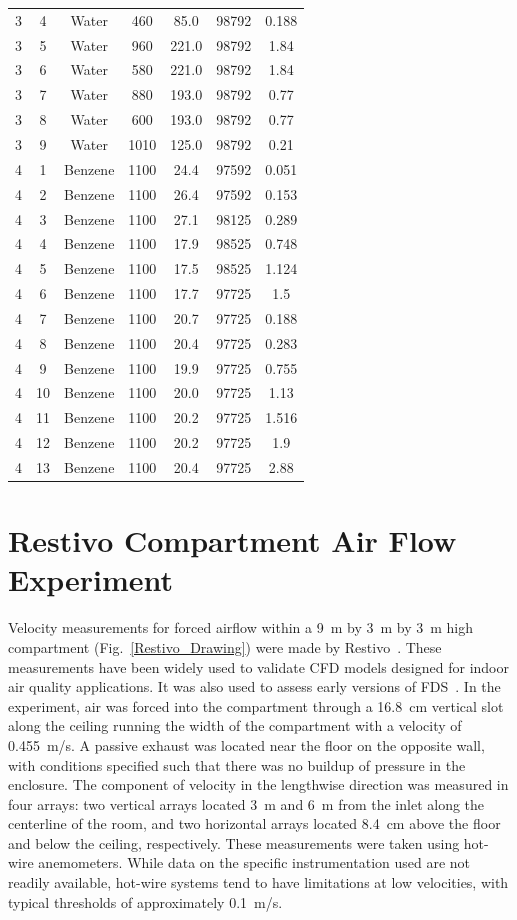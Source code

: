 \begin{longtable}[c]{|c|c|c|c|c|c|c|}
3 & 4 & Water & 460 & 85.0 & 98792 & 0.188 \\
3 & 5 & Water & 960 & 221.0 & 98792 & 1.84 \\
3 & 6 & Water & 580 & 221.0 & 98792 & 1.84 \\
3 & 7 & Water & 880 & 193.0 & 98792 & 0.77 \\
3 & 8 & Water & 600 & 193.0 & 98792 & 0.77 \\
3 & 9 & Water & 1010 & 125.0 & 98792 & 0.21 \\
4 & 1 & Benzene & 1100 & 24.4 & 97592 & 0.051 \\
4 & 2 & Benzene & 1100 & 26.4 & 97592 & 0.153 \\
4 & 3 & Benzene & 1100 & 27.1 & 98125 & 0.289 \\
4 & 4 & Benzene & 1100 & 17.9 & 98525 & 0.748 \\
4 & 5 & Benzene & 1100 & 17.5 & 98525 & 1.124 \\
4 & 6 & Benzene & 1100 & 17.7 & 97725 & 1.5 \\
4 & 7 & Benzene & 1100 & 20.7 & 97725 & 0.188 \\
4 & 8 & Benzene & 1100 & 20.4 & 97725 & 0.283 \\
4 & 9 & Benzene & 1100 & 19.9 & 97725 & 0.755 \\
4 & 10 & Benzene & 1100 & 20.0 & 97725 & 1.13 \\
4 & 11 & Benzene & 1100 & 20.2 & 97725 & 1.516 \\
4 & 12 & Benzene & 1100 & 20.2 & 97725 & 1.9 \\
4 & 13 & Benzene & 1100 & 20.4 & 97725 & 2.88 \\
\hline
\end{longtable}

\section{Restivo Compartment Air Flow Experiment}
\label{Restivo_Description}

Velocity measurements for forced airflow within a 9~m by 3~m by 3~m high compartment (Fig.~\ref{Restivo_Drawing}) were made by Restivo~\cite{Restivo:1979}. These measurements have been widely used to validate CFD models designed for indoor air quality applications. It was also used to assess early versions of FDS~\cite{Emmerich:1,Emmerich:2,Musser:1}. In the experiment, air was forced into the compartment through a 16.8~cm vertical slot along the ceiling running the width of the compartment with a velocity of 0.455~m/s. A passive exhaust was located near the floor on the opposite wall, with conditions specified such that there was no buildup of pressure in the enclosure. The component of velocity in the lengthwise direction was measured in four arrays: two vertical arrays located 3~m and 6~m  from the inlet along the
centerline of the room, and two horizontal arrays located 8.4~cm above the floor and below the ceiling, respectively. These measurements were taken using hot-wire anemometers. While data on the specific instrumentation used are not readily available, hot-wire systems tend to have limitations at low velocities, with typical thresholds of approximately 0.1~m/s.

